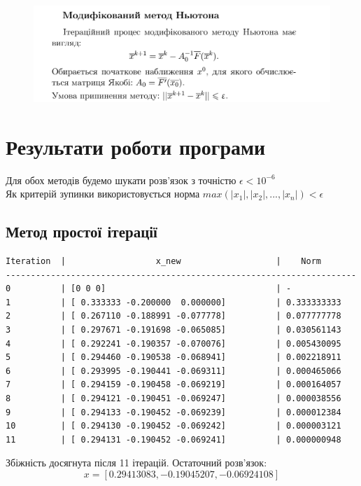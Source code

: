 \documentclass[a4paper, 12pt]{article}
\begin{document}
\begin{figure}[ht]
	\centering
	\includegraphics[width=0.9\linewidth]{mod_nuton1.png}
\end{figure}

\newpage

\section{Результати роботи програми}

Для обох методів будемо шукати розв'язок з точністю $\epsilon < 10^{-6}$ \\
Як критерій зупинки використовується норма $max(|x_1|, |x_2|, ..., |x_n|) < \epsilon$ \\ 

\subsection{Метод простої ітерації}

\begin{verbatim}
Iteration  |                  x_new                   |    Norm   
----------------------------------------------------------------------
0          | [0 0 0]                                  | -
1          | [ 0.333333 -0.200000  0.000000]          | 0.333333333
2          | [ 0.267110 -0.188991 -0.077778]          | 0.077777778
3          | [ 0.297671 -0.191698 -0.065085]          | 0.030561143
4          | [ 0.292241 -0.190357 -0.070076]          | 0.005430095
5          | [ 0.294460 -0.190538 -0.068941]          | 0.002218911
6          | [ 0.293995 -0.190441 -0.069311]          | 0.000465066
7          | [ 0.294159 -0.190458 -0.069219]          | 0.000164057
8          | [ 0.294121 -0.190451 -0.069247]          | 0.000038556
9          | [ 0.294133 -0.190452 -0.069239]          | 0.000012384
10         | [ 0.294130 -0.190452 -0.069242]          | 0.000003121
11         | [ 0.294131 -0.190452 -0.069241]          | 0.000000948
\end{verbatim}

Збіжність досягнута після 11 ітерацій. Остаточний розв'язок:
\[
x = [ 0.29413083, -0.19045207, -0.06924108]
\]
\end{document}
